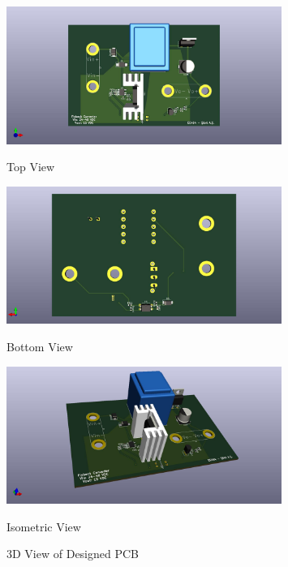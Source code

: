\begin{figure}[H]
\begin{minipage}{1\textwidth} 
\centering
\includegraphics[width=0.8\textwidth]{figures/pcb3dtop.jpg}
\caption{Top View}
\end{minipage}    
\begin{minipage}{1\textwidth} 
\centering
\includegraphics[width=0.8\textwidth]{figures/pcb3dbot.jpg}
\caption{Bottom View}
\end{minipage}    
\begin{minipage}{1\textwidth} 
\centering
\includegraphics[width=0.8\textwidth]{figures/pcb3diso.jpg}
\caption{Isometric View}
\end{minipage}    
\caption{3D View of Designed PCB}
\label{fig:pcb3D}
\end{figure}

